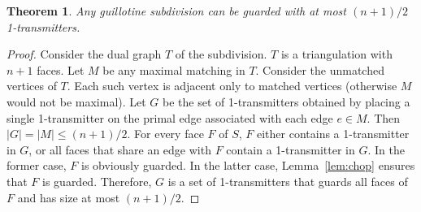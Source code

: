 \documentclass{article}
\newtheorem{thm}{Theorem}
\begin{document}
\begin{thm}
Any guillotine subdivision can be guarded with at most $(n+1)/2$ 1-transmitters.
\end{thm}

\begin{proof}
Consider the dual graph $T$ of the subdivision. $T$ is a triangulation
with $n+1$ faces.  Let $M$ be any maximal matching in $T$.  Consider the
unmatched vertices of $T$.  Each such vertex is adjacent only to matched
vertices (otherwise $M$ would not be maximal).  Let $G$ be the set of
1-transmitters obtained by placing a single 1-transmitter on the primal
edge associated with each edge $e\in M$.  Then $|G|=|M|\le (n+1)/2$.
For every face $F$ of $S$, $F$ either contains a 1-transmitter in $G$,
or all faces that share an edge with $F$ contain a 1-transmitter in $G$.
In the former case, $F$ is obviously guarded. In the latter case,
Lemma~\ref{lem:chop} ensures that $F$ is guarded.  Therefore, $G$ is a set of 1-transmitters that guards all faces of $F$ and has size at most $(n+1)/2$.
%
%
%
%
%
%
%
\end{proof}
\end{document}
